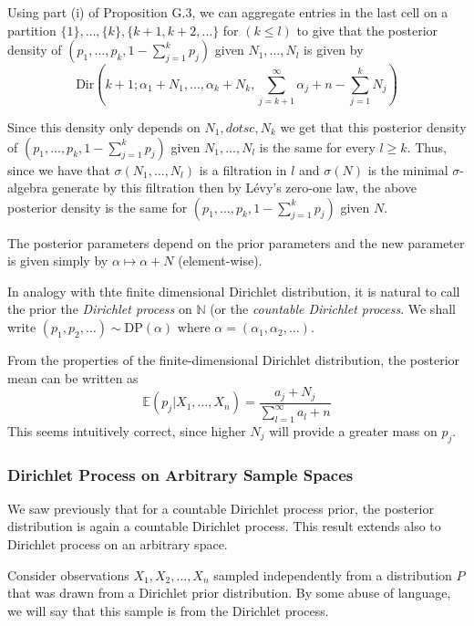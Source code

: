 \documentclass[a4paper,11pt]{article}
\theoremstyle{theorem}
\theoremstyle{definition}
\theoremstyle{remark}
\providecommand{\E}{\mathbb{E}}
\begin{document}
Using part (i) of Proposition G.3, we can aggregate entries in the last cell on a partition $\{1\}, \dotsc, \{k\}, \{k+1, k+2, \dotsc \}$ for $(k \leq l)$ to give that the posterior density of $\left(p_1, \dotsc, p_k, 1 - \sum_{j=1}^{k}{p_j}\right)$ given $N_1, \dotsc, N_l$ is given by
\[
\text{Dir}\left(k+1; \alpha_1 + N_1, \dotsc, \alpha_k + N_k, \sum_{j=k+1}^{\infty}{\alpha_j} + n - \sum_{j=1}^{k}{N_j}\right)
\]

Since this density only depends on $N_1, dotsc, N_k$ we get that this posterior density of $\left(p_1, \dotsc, p_k, 1 - \sum_{j=1}^{k}{p_j}\right)$ given $N_1, \dotsc, N_l$ is the same for every $l \geq k$. Thus, since we have that $\sigma(N_1, \dotsc, N_l)$ is a filtration in $l$ and $\sigma(N)$ is the minimal $\sigma$-algebra generate by this filtration then by L\'{e}vy's zero-one law, the above posterior density is the same for $\left(p_1, \dotsc, p_k, 1 - \sum_{j=1}^{k}{p_j}\right)$ given $N$.

The posterior parameters depend on the prior parameters and the new parameter is given simply by $\alpha \mapsto \alpha + N$ (element-wise).

In analogy with thte finite dimensional Dirichlet distribution, it is natural to call the prior the \textit{Dirichlet process} on $\mathbb{N}$ (or the \textit{countable Dirichlet process}. We shall write $(p_1, p_2, \dotsc) \sim \text{DP}(\alpha)$ where $\alpha = (\alpha_1, \alpha_2, \dotsc )$.

From the properties of the finite-dimensional Dirichlet distribution, the posterior mean can be written as
\[
\E \left(p_j | X_1, \dotsc, X_n \right) = \frac{a_j + N_j}{\sum_{l=1}^{\infty}{a_l} + n}
\]
This seems intuitively correct, since higher $N_j$ will provide a greater mass on $p_j$.

\subsubsection{Dirichlet Process on Arbitrary Sample Spaces}

We saw previously that for a countable Dirichlet process prior, the posterior distribution is again a countable Dirichlet process. This result extends also to Dirichlet process on an arbitrary space.

Consider observations $X_1, X_2, \dotsc, X_n$ sampled independently from a distribution $P$ that was drawn from a Dirichlet prior distribution. By some abuse of language, we will say that this sample is from the Dirichlet process.
\end{document}
